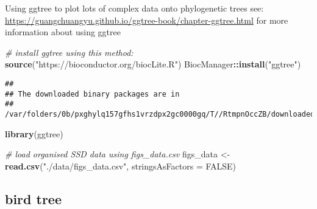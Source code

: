 \documentclass[]{article}
\newenvironment{Shaded}{\begin{snugshade}}{\end{snugshade}}
\newcommand{\KeywordTok}[1]{\textcolor[rgb]{0.13,0.29,0.53}{\textbf{#1}}}
\newcommand{\DataTypeTok}[1]{\textcolor[rgb]{0.13,0.29,0.53}{#1}}
\newcommand{\StringTok}[1]{\textcolor[rgb]{0.31,0.60,0.02}{#1}}
\newcommand{\CommentTok}[1]{\textcolor[rgb]{0.56,0.35,0.01}{\textit{#1}}}
\newcommand{\OtherTok}[1]{\textcolor[rgb]{0.56,0.35,0.01}{#1}}
\newcommand{\OperatorTok}[1]{\textcolor[rgb]{0.81,0.36,0.00}{\textbf{#1}}}
\newcommand{\NormalTok}[1]{#1}
\begin{document}
Using ggtree to plot lots of complex data onto phylogenetic trees see:
\url{https://guangchuangyu.github.io/ggtree-book/chapter-ggtree.html}
for more information about using ggtree

\begin{Shaded}
\begin{Highlighting}[]
\CommentTok{# install ggtree using this method:}
  \KeywordTok{source}\NormalTok{(}\StringTok{"https://bioconductor.org/biocLite.R"}\NormalTok{)}
\NormalTok{  BiocManager}\OperatorTok{::}\KeywordTok{install}\NormalTok{(}\StringTok{"ggtree"}\NormalTok{)}
\end{Highlighting}
\end{Shaded}

\begin{verbatim}
## 
## The downloaded binary packages are in
##  /var/folders/0b/pxghylq157gfhs1vrzdpx2gc0000gq/T//RtmpnOccZB/downloaded_packages
\end{verbatim}

\begin{Shaded}
\begin{Highlighting}[]
  \KeywordTok{library}\NormalTok{(ggtree)}

\CommentTok{# load organised SSD data using figs_data.csv }
\NormalTok{  figs_data <-}\StringTok{ }\KeywordTok{read.csv}\NormalTok{(}\StringTok{"./data/figs_data.csv"}\NormalTok{, }\DataTypeTok{stringsAsFactors =} \OtherTok{FALSE}\NormalTok{)}
\end{Highlighting}
\end{Shaded}

\subsection{bird tree}\label{bird-tree}
\end{document}
